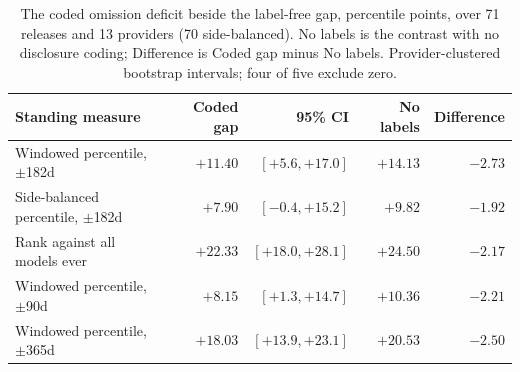 \begin{table}[!htb]
\centering
\small
\setlength{\tabcolsep}{5pt}
\begin{tabular}{lrrrr}
\toprule
Standing measure & Coded gap & 95\% CI & No labels & Difference \\
\midrule
Windowed percentile, $\pm$182d & $+11.40$ & $[+5.6, +17.0]$ & $+14.13$ & $-2.73$ \\
Side-balanced percentile, $\pm$182d & $+7.90$ & $[-0.4, +15.2]$ & $+9.82$ & $-1.92$ \\
Rank against all models ever & $+22.33$ & $[+18.0, +28.1]$ & $+24.50$ & $-2.17$ \\
Windowed percentile, $\pm$90d & $+8.15$ & $[+1.3, +14.7]$ & $+10.36$ & $-2.21$ \\
Windowed percentile, $\pm$365d & $+18.03$ & $[+13.9, +23.1]$ & $+20.53$ & $-2.50$ \\
\bottomrule
\end{tabular}
\caption{%
The coded omission deficit beside the label-free gap, percentile points, over 71 releases and 13 providers (70 side-balanced). No labels is the contrast with no disclosure coding; Difference is Coded gap minus No labels. Provider-clustered bootstrap intervals; four of five exclude zero.}
\label{tab:coding}
\end{table}
